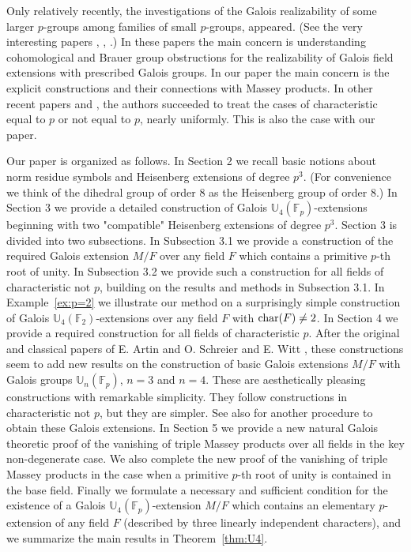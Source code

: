 \documentclass[12pt,leqno]{amsart}
\theoremstyle{plain}
\theoremstyle{definition}
\newcommand{\F}{{\mathbb F}}
\newcommand{\U}{{\mathbb U}}
\begin{document}
Only relatively recently, the  investigations of the Galois realizability of some larger $p$-groups among families of small $p$-groups, appeared. (See the very interesting papers \cite{Mi1}, \cite{Mi2}, \cite{GS}.)
 In these papers the main concern is understanding cohomological and Brauer group obstructions for the realizability of Galois field extensions with prescribed Galois groups. In our paper the main concern is the explicit constructions and their connections with Massey products.
 In other recent papers \cite{CMS} and \cite{Sch}, the authors succeeded to treat the cases of characteristic equal to $p$ or not equal to $p$, nearly uniformly. This is also the case with  our paper.    

Our paper is organized as follows. In Section 2 we recall basic notions about norm residue symbols and Heisenberg extensions of degree $p^3$. (For convenience we think of  the dihedral group of order 8 as the Heisenberg group of order 8.) In Section 3 we provide a detailed construction of Galois $\U_4(\F_p)$-extensions beginning with two "compatible" Heisenberg extensions of degree $p^3$. Section 3 is divided into two subsections. In Subsection 3.1 we provide a construction of the required Galois extension $M/F$ over any field $F$ which contains a primitive $p$-th root of unity. In Subsection 3.2 we provide such a construction
for all fields of characteristic not $p$, building on the results and methods in Subsection 3.1. 
In Example~\ref{ex:p=2} we illustrate our method on a surprisingly simple construction of Galois $\U_4(\F_2)$-extensions over any field $F$ with ${\rm char}(F)\not=2$. 
In Section 4 we provide a required construction for all fields of characteristic $p$.
After the original and classical papers of E. Artin and O. Schreier \cite{ASch} and E. Witt \cite{Wi}, these constructions seem to add new results on the construction of basic Galois extensions $M/F$ with Galois groups $\U_n(\mathbb{F}_p)$, $n = 3$ and $n = 4$.  These are aesthetically pleasing constructions with remarkable simplicity.  They follow constructions in characteristic not $p$, but they are simpler. See also \cite[Section 5.6 and Appendix A1]{JLY} for another procedure to obtain these Galois extensions. 
In Section 5 we provide a new natural Galois theoretic proof of the vanishing of triple Massey products over all fields in the key non-degenerate case. We also complete the new proof of the vanishing of triple Massey products in the case when a primitive $p$-th root of unity is contained in the base field.
Finally we formulate a necessary and sufficient condition for the existence of a Galois $\U_4(\F_p)$-extension $M/F$ which contains an elementary $p$-extension of any field $F$ (described by three linearly independent characters), and we summarize the main results in Theorem~\ref{thm:U4}.
\end{document}
